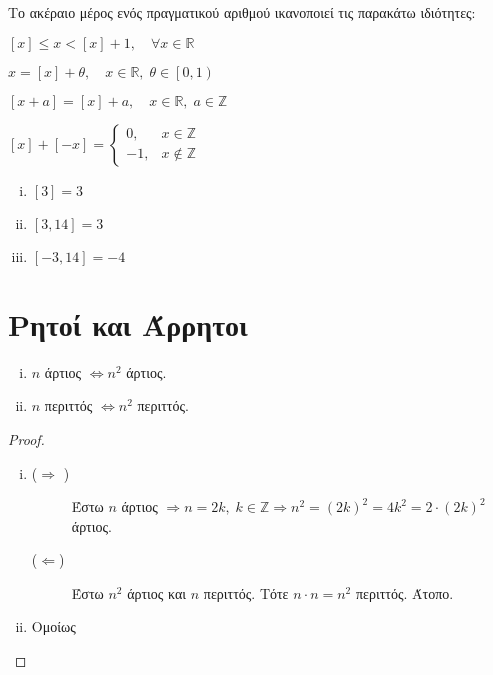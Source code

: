 Το ακέραιο μέρος ενός πραγματικού αριθμού ικανοποιεί τις παρακάτω ιδιότητες:

\begin{myitemize}
  \item $ [x] \leq x < [x]+1, \quad \forall x \in \mathbb{R} $
  \item $ x = [x]+ \theta, \quad x \in \mathbb{R}, \; \theta \in \left[0,1\right) $
  \item $ [x+a]= [x] + a, \quad x \in \mathbb{R}, \; a \in \mathbb{Z} $
  \item $ [x]+[-x] = 
    \begin{cases} 
      0, & x \in \mathbb{Z} \\
      -1, & x \not \in \mathbb{Z}
    \end{cases}$
\end{myitemize}

\begin{example}
\item {}
  \begin{enumerate}[(i)]
    \item $ [3]=3 $
    \item $ [3,14] = 3  $
    \item $ [-3,14] =-4 $
  \end{enumerate}
\end{example}


\section{Ρητοί και Άρρητοι}

\begin{lem}
\item {}
  \begin{enumerate}[(i)]
    \item $n$ άρτιος $ \Leftrightarrow n^{2} $ άρτιος.
    \item $ n $ περιττός $ \Leftrightarrow n^{2} $ περιττός.
  \end{enumerate}
\end{lem}

\begin{proof}
\item {}
  \begin{enumerate}[(i)]
    \item 
      \begin{description}
        \item [($ \Rightarrow $ )] 
          Έστω $ n $ άρτιος $ \Rightarrow n =2k, \; k \in \mathbb{Z} 
          \Rightarrow n^{2} = (2k)^{2} = 4k^{2} = 2\cdot (2k)^{2} $ άρτιος. 
        \item [($ \Leftarrow $)] Έστω $ n^{2} $ άρτιος και $n$ περιττός. Τότε 
          $ n \cdot n = n^{2} $ περιττός. Άτοπο.
      \end{description}

    \item Ομοίως
  \end{enumerate}
\end{proof}

